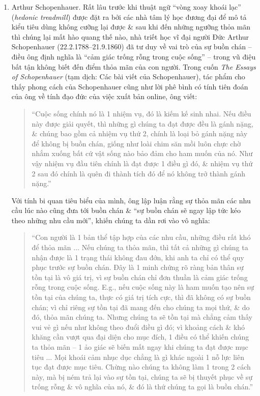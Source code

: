 \documentclass{article}
\begin{document}
\begin{enumerate}
\begin{quote}
	\end{quote}
	\item {\sc Arthur Schopenhauer.} Rất lâu trước khi thuật ngữ ``vòng xoay khoái lạc'' ({\it hedonic treadmill}) được đặt ra bởi các nhà tâm lý học đương đại để mô tả kiểu tiêu dùng không cưỡng lại được \& sau khi đến những ngưỡng thỏa mãn thì chúng lại mất hào quang thế nào, nhà triết học vĩ đại người Đức {\sc Arthur Schopenhauer} (22.2.1788--21.9.1860) đã tư duy về vai trò của sự buồn chán -- điều ông định nghĩa là ``cảm giác trống rỗng trong cuộc sống'' -- trong vũ điệu bất tận không biết đến điểm thỏa mãn của con người. Trong cuốn {\it The Essays of Schopenhauer} (tạm dịch: Các bài viết của Schopenhauer), tác phẩm cho thấy phong cách của Schopenhauer cũng như lời phê bình có tính tiên đoán của ông về tính đạo đức của việc xuất bản online, ông viết:
	\begin{quote}
		``Cuộc sống chính nó là 1 nhiệm vụ, đó là kiếm kế sinh nhai. Nếu điều này được giải quyết, thì những gì chúng ta đạt được đều là gánh nặng, \& chúng bao gồm cả nhiệm vụ thứ 2, chính là loại bỏ gánh nặng này để không bị buồn chán, giống như loài chim săn mồi luôn chực chờ nhắm xuống bất cứ vật sống nào bảo đảm cho ham muốn của nó. Như vậy nhiệm vụ đầu tiên chính là đạt được 1 điều gì đó, \& nhiệm vụ thứ 2 sau đó chính là quên đi thành tích đó để nó không trở thành gánh nặng.''
	\end{quote}
	Với tính bi quan tiêu biểu của mình, ông lập luận rằng sự thỏa mãn các nhu cầu lúc nào cũng đưa tới buồn chán \& ``sự buồn chán sẽ ngay lập tức kéo theo những nhu cầu mới'', khiến chúng ta dần rơi vào vô nghĩa:
	\begin{quote}
		``Con người là 1 bản thể tập hợp của các nhu cầu, những điều rất khó để thỏa mãn $\ldots$ Nếu chúng ta thỏa mãn, thì tất cả những gì chúng ta nhận được là 1 trạng thái không đau đớn, khi anh ta chỉ có thể quy phục trước sự buồn chán. Đây là 1 minh chứng rõ ràng bản thân sự tồn tại là vô giá trị, vì sự buồn chán chỉ đơn thuần là cảm giác trống rỗng trong cuộc sống. E.g., nếu cuộc sống này là ham muốn tạo nên sự tồn tại của chúng ta, thực có giá trị tích cực, thì đã không có sự buồn chán; vì chỉ riêng sự tồn tại đã mang đến cho chúng ta mọi thứ, \& do đó, thỏa mãn chúng ta. Nhưng chúng ta sẽ tồn tại mà chẳng cảm thấy vui vẻ gì nếu như không theo đuổi điều gì đó; vì khoảng cách \& khó khăng cần vượt qua đại diện cho mục đích, 1 điều có thể khiến chúng ta thỏa mãn -- 1 ảo giác sẽ biến mất ngay khi chúng ta đạt được mục tiêu $\ldots$ Mọi khoái cảm nhục dục chẳng là gì khác ngoài 1 nỗ lực liên tục đạt được mục tiêu. Chừng nào chúng ta không làm 1 trong 2 cách này, mà bị ném trả lại vào sự tồn tại, chúng ta sẽ bị thuyết phục về sự trống rỗng \& vô nghĩa của nó, \& đó là thứ chúng ta gọi là buồn chán.''

\end{quote}
\end{enumerate}
\end{document}
